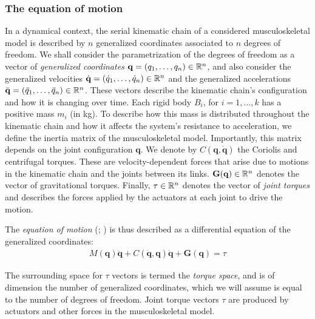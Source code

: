 \subsubsection*{The equation of motion}
In a dynamical context, the serial kinematic chain of a considered musculoskeletal model is described by $n$ generalized coordinates associated to $n$ degrees of freedom. We shall consider the parametrization of the degrees of freedom as a vector of \emph{generalized coordinates} $\mathbf{q} = (q_1, \dots, q_n)\in \mathbb{R}^n$, and also consider the generalized velocities $\dot{\mathbf{q}} = (\dot{q}_1, \dots, \dot{q}_n)\in \mathbb{R}^n$ and the generalized accelerations $\ddot{\mathbf{q}} = (\ddot{q}_1, \dots, \ddot{q}_n)\in \mathbb{R}^n$. These vectors describe the kinematic chain's configuration and how it is changing over time. Each rigid body $B_i$, for $i = 1,\dots, k$ has a positive mass $m_i$ (in kg). To describe how this mass is distributed throughout the kinematic chain and how it affects the system's resistance to acceleration, we define the inertia matrix of the musculoskeletal model. Importantly, this matrix depends on the joint configuration $\mathbf{q}$. We denote by $C(\mathbf{q}, \dot{\mathbf{q}})$ the Coriolis and centrifugal torques. These are velocity-dependent forces that arise due to motions in the kinematic chain and the joints between its links. $\mathbf{G}(\mathbf{q}) \in \mathbb{R}^n$ denotes the vector of gravitational torques.
Finally, $\tau\in \mathbb{R}^n$ denotes the vector of \emph{joint torques} and describes the forces applied by the actuators at each joint to drive the motion.

The \emph{equation of motion} (\cite{lauGeneralizedModelingMultilink2013}; \cite{skuricCoupledViewPhysical}) is thus described as a differential equation of the generalized coordinates:
\begin{align*}
    M(\mathbf{q})\ddot{\mathbf{q}} + C(\dot{\mathbf{q}}, \mathbf{q})\dot{\mathbf{q}} + \mathbf{G}(\mathbf{q}) = \tau
\end{align*}

The surrounding space for $\tau$ vectors is termed the \emph{torque space}, and is of dimension the number of generalized coordinates, which we will assume is equal to the number of degrees of freedom.
Joint torque vectors $\tau$ are produced by actuators and other forces in the musculoskeletal model. 

